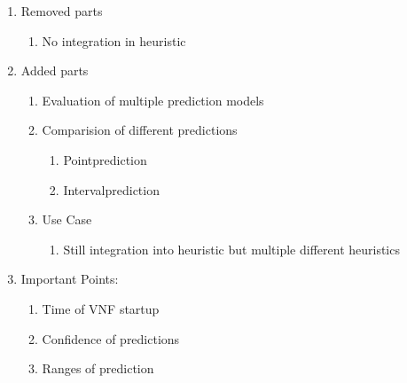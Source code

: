 \documentclass[10pt,a4paper]{article}
\begin{document}
	\begin{enumerate}[label*=\arabic*.]
		\item Removed parts
		\begin{enumerate}[label*=\arabic*.]
			\item No integration in heuristic
		\end{enumerate}
		\item Added parts
		\begin{enumerate}[label*=\arabic*.]
			\item Evaluation of multiple prediction models
			\item Comparision of different predictions
			\begin{enumerate}[label*=\arabic*.]
				\item Pointprediction
				\item Intervalprediction
			\end{enumerate}
			\item Use Case
			\begin{enumerate}[label*=\arabic*.]
				\item Still integration into heuristic but multiple different heuristics
			\end{enumerate}			
		\end{enumerate}
		\item Important Points:
		\begin{enumerate}[label*=\arabic*.]
			\item Time of VNF startup
			\item Confidence of predictions
			\item Ranges of prediction
		\end{enumerate}
	\end{enumerate}
\end{document}
